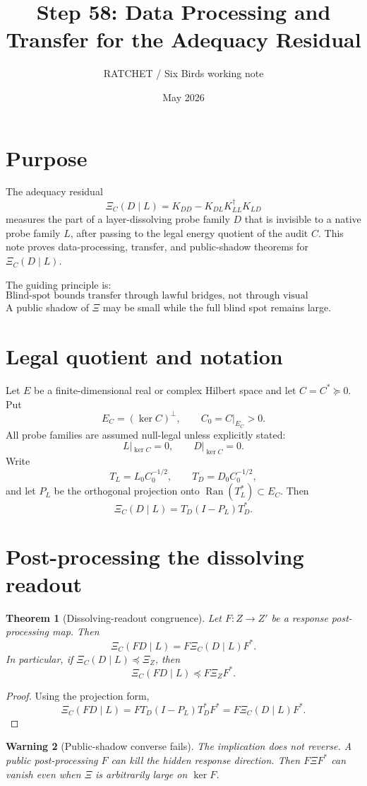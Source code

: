 \documentclass[11pt]{article}
\title{Step 58: Data Processing and Transfer for the Adequacy Residual}
\author{RATCHET / Six Birds working note}
\date{May 2026}
\newtheorem{theorem}{Theorem}[section]
\newtheorem{warning}[theorem]{Warning}
\DeclareMathOperator{\Ran}{Ran}
\newcommand{\pre}{\preceq}
\newcommand{\suc}{\succeq}
\begin{document}
\maketitle

\section{Purpose}
The adequacy residual
\[
  \Xi_C(D\mid L)
  =K_{DD}-K_{DL}K_{LL}^{\dagger}K_{LD}
\]
measures the part of a layer-dissolving probe family $D$ that is invisible to a native probe family $L$, after passing to the legal energy quotient of the audit $C$.  This note proves data-processing, transfer, and public-shadow theorems for $\Xi_C(D\mid L)$.

The guiding principle is:
\[
  \boxed{\text{Blind-spot bounds transfer through lawful bridges, not through visual resemblance.}}
\]
A public shadow of $\Xi$ may be small while the full blind spot remains large.

\section{Legal quotient and notation}
Let $E$ be a finite-dimensional real or complex Hilbert space and let $C=C^*\suc0$.  Put
\[
  E_C=(\ker C)^\perp,\qquad C_0=C|_{E_C}>0.
\]
All probe families are assumed null-legal unless explicitly stated:
\[
  L|_{\ker C}=0,\qquad D|_{\ker C}=0.
\]
Write
\[
  T_L=L_0C_0^{-1/2},\qquad T_D=D_0C_0^{-1/2},
\]
and let $P_L$ be the orthogonal projection onto $\Ran(T_L^*)\subset E_C$.  Then
\[
  \Xi_C(D\mid L)=T_D(I-P_L)T_D^*.
\]

\section{Post-processing the dissolving readout}

\begin{theorem}[Dissolving-readout congruence]
Let $F:Z\to Z'$ be a response post-processing map.  Then
\[
  \Xi_C(FD\mid L)=F\Xi_C(D\mid L)F^*.
\]
In particular, if $\Xi_C(D\mid L)\pre \Xi_Z$, then
\[
  \Xi_C(FD\mid L)\pre F\Xi_ZF^*.
\]
\end{theorem}

\begin{proof}
Using the projection form,
\[
  \Xi_C(FD\mid L)=FT_D(I-P_L)T_D^*F^*=F\Xi_C(D\mid L)F^*.
\]
\end{proof}

\begin{warning}[Public-shadow converse fails]
The implication does not reverse.  A public post-processing $F$ can kill the hidden response direction.  Then $F\Xi F^*$ can vanish even when $\Xi$ is arbitrarily large on $\ker F$.
\end{warning}
\end{document}
